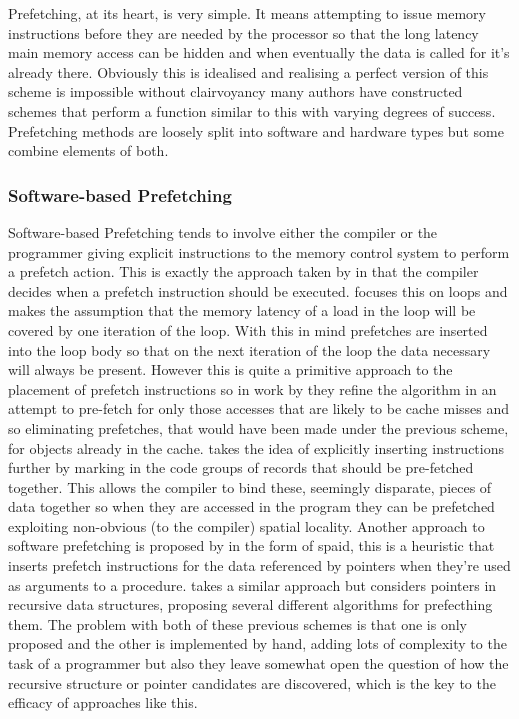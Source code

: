 Prefetching, at its heart, is very simple. It means attempting to issue memory instructions before they are needed by the processor so that the long latency main memory access can be hidden and when eventually the data is called for it's already there. Obviously this is idealised and realising a perfect version of this scheme is impossible without clairvoyancy many authors have constructed schemes that perform a function similar to this with varying degrees of success. Prefetching methods are loosely split into software and hardware types but some combine elements of both.

\subsubsection{Software-based Prefetching}

Software-based Prefetching tends to involve either the compiler or the programmer giving explicit instructions to the memory control system to perform a prefetch action. This is exactly the approach taken by \citet{callahanSoftwarePrefetching1991} in that the compiler decides when a prefetch instruction should be executed. \citeauthor{callahanSoftwarePrefetching1991} focuses this on loops and makes the assumption that the memory latency of a load in the loop will be covered by one iteration of the loop. With this in mind prefetches are inserted into the loop body so that on the next iteration of the loop the data necessary will always be present. However this is quite a primitive approach to the placement of prefetch instructions so in work by \citet{mowryDesignEvaluationCompiler1992} they refine the algorithm in an attempt to pre-fetch for only those accesses that are likely to be cache misses and so eliminating prefetches, that would have been made under the previous scheme, for objects already in the cache.  \citet{zhangSpeedingIrregularApplications1995} takes the idea of explicitly inserting instructions further by marking in the code groups of records that should be pre-fetched together. This allows the compiler to bind these, seemingly disparate, pieces of data together so when they are accessed in the program they can be prefetched exploiting non-obvious (to the compiler) spatial locality. Another approach to software prefetching is proposed by \citet{lipastiSPAIDSoftwarePrefetching1995} in the form of \gls{spaid}, this is a heuristic that inserts prefetch instructions for the data referenced by pointers when they're used as arguments to a procedure. \citet{lukCompilerbasedPrefetchingRecursive1996} takes a similar approach but considers pointers in recursive data structures, proposing several different algorithms for prefecthing them. The problem with both of these previous schemes is that one is only proposed and the other is implemented by hand, adding lots of complexity to the task of a programmer but also they leave somewhat open the question of how the recursive structure or pointer candidates are discovered, which is the key to the efficacy of approaches like this.

